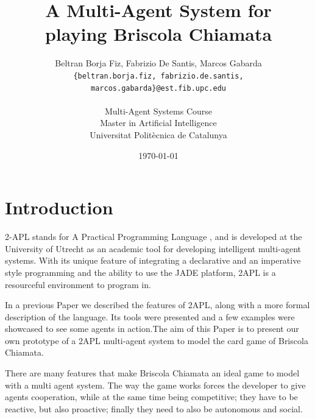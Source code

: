 \documentclass[a4paper]{article}
\begin{document}
\title{A Multi-Agent System for\\ playing Briscola Chiamata}
 
\author{Beltran Borja Fiz, Fabrizio De Santis, Marcos Gabarda\\
\small \texttt{\{beltran.borja.fiz, fabrizio.de.santis, marcos.gabarda\}@est.fib.upc.edu}\\
\\
Multi-Agent Systems Course\\
Master in Artificial Intelligence\\
Universitat Polit\`ecnica de Catalunya}
\date{\today}

\newenvironment{fminipage}%
  {\begin{Sbox}\begin{minipage}}%
  {\end{minipage}\end{Sbox}\fbox{\TheSbox}}

\maketitle

\tableofcontents

\newpage

\section{Introduction}\label{sec:intro}

2-APL stands for A Practical Programming Language , and is developed at the University of Utrecht as an academic tool for developing intelligent multi-agent systems. With its unique feature of integrating a declarative and an imperative style programming and the ability to use the JADE platform, 2APL is a resourceful environment to program in.

In a previous Paper we described the features of 2APL, along with a more formal description of the language. Its tools were presented and a few examples were showcased to see some agents in action.The aim of this Paper is to present our own prototype of a 2APL multi-agent system to model the card game of Briscola Chiamata. 

There are many features that make Briscola Chiamata an ideal game to model with a multi agent system. The way the game works forces the developer to give agents cooperation, while at the same time being competitive; they have to be reactive, but also proactive; finally they need to also be autonomous and social.
\end{document}
